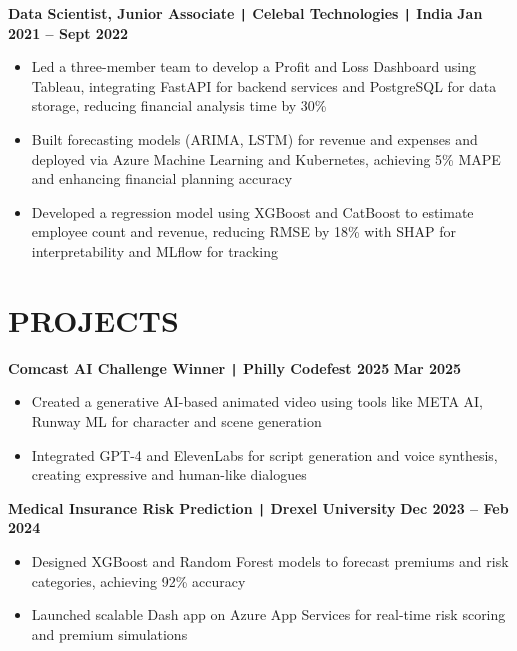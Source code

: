 \documentclass[10pt]{article}
\begin{document}
\vspace{-0.2cm}
\noindent
\textbf{Data Scientist, Junior Associate \texttt{|} Celebal Technologies \texttt{|} India} \hfill \textbf{Jan 2021 -- Sept 2022} 
\vspace{-0.15cm}
\begin{itemize}[leftmargin=0.5cm, itemsep=0pt]

    \item Led a three-member team to develop a Profit and Loss Dashboard using Tableau, integrating FastAPI for backend services and PostgreSQL for data storage, reducing financial analysis time by 30\%

    \item Built forecasting models (ARIMA, LSTM) for revenue and expenses and deployed via Azure Machine Learning and Kubernetes, achieving 5\% MAPE and enhancing financial planning accuracy

    \item Developed a regression model using XGBoost and CatBoost to estimate employee count and revenue, reducing RMSE by 18\% with SHAP for interpretability and MLflow for tracking

\end{itemize}


\vspace{-0.75cm}
\section*{PROJECTS}
\vspace{-0.1cm}

\noindent
\textbf{Comcast AI Challenge Winner \texttt{|} Philly Codefest 2025} \hfill \textbf{Mar 2025} \\
\vspace{-0.4cm}
\begin{itemize}[leftmargin=0.6cm, itemsep=-0.1cm, topsep=0cm]

    \item Created a generative AI-based animated video using tools like META AI, Runway ML for character and scene generation

    \item Integrated GPT-4 and ElevenLabs for script generation and voice synthesis, creating expressive and human-like dialogues

\end{itemize}

\noindent
\textbf{Medical Insurance Risk Prediction \texttt{|} Drexel University} \hfill \textbf{Dec 2023 -- Feb 2024} \\
\vspace{-0.4cm}
\begin{itemize}[leftmargin=0.6cm, itemsep=-0.1cm, topsep=0cm]

    \item Designed XGBoost and Random Forest models to forecast premiums and risk categories, achieving 92\% accuracy

    \item Launched scalable Dash app on Azure App Services for real-time risk scoring and premium simulations

\end{itemize}
\end{document}
